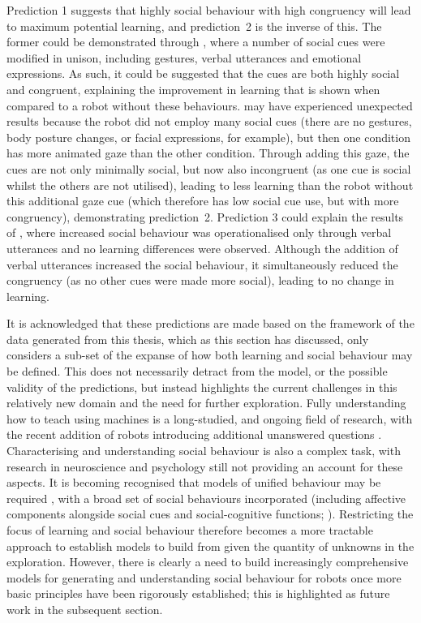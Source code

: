 Prediction 1 suggests that highly social behaviour with high congruency will lead to maximum potential \gls{learning}, and prediction~2 is the inverse of this. The former could be demonstrated through \citet{saerbeck2010expressive}, where a number of social cues were modified in unison, including gestures, verbal utterances and emotional expressions. As such, it could be suggested that the cues are both highly social and congruent, explaining the improvement in \gls{learning} that is shown when compared to a robot without these behaviours. \citet{herberg2015robot} may have experienced unexpected results because the robot did not employ many social cues (there are no gestures, body posture changes, or facial expressions, for example), but then one condition has more animated gaze than the other condition. Through adding this gaze, the cues are not only minimally social, but now also incongruent (as one cue is social whilst the others are not utilised), leading to less \gls{learning} than the robot without this additional gaze cue (which therefore has low social cue use, but with more congruency), demonstrating prediction~2. Prediction 3 could explain the results of \citet{kanda2012children}, where increased social behaviour was operationalised only through verbal utterances and no \gls{learning} differences were observed. Although the addition of verbal utterances increased the social behaviour, it simultaneously reduced the congruency (as no other cues were made more social), leading to no change in \gls{learning}.

It is acknowledged that these predictions are made based on the framework of the data generated from this thesis, which as this section has discussed, only considers a sub-set of the expanse of how both \gls{learning} and social behaviour may be defined. This does not necessarily detract from the model, or the possible validity of the predictions, but instead highlights the current challenges in this relatively new domain and the need for further exploration. Fully understanding how to teach using machines is a long-studied, and ongoing field of research, with the recent addition of robots introducing additional unanswered questions \citep{timms2016letting}. Characterising and understanding social behaviour is also a complex task, with research in neuroscience and psychology still not providing an account for these aspects. It is becoming recognised that models of unified behaviour may be required \citep{zaki2013cue}, with a broad set of social behaviours incorporated (including affective components alongside social cues and social-cognitive functions; \citealp{pfeiffer2013gaze}). Restricting the focus of \gls{learning} and social behaviour therefore becomes a more tractable approach to establish models to build from given the quantity of unknowns in the exploration. However, there is clearly a need to build increasingly comprehensive models for generating and understanding social behaviour for robots once more basic principles have been rigorously established; this is highlighted as future work in the subsequent section.


